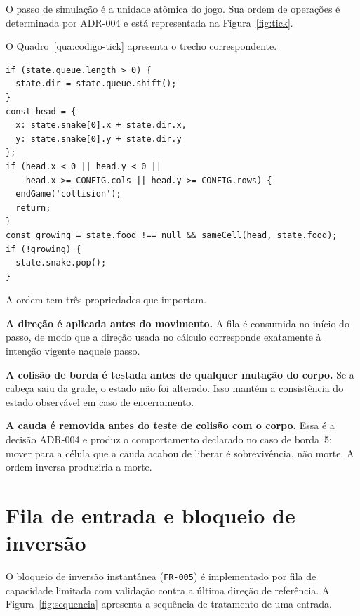O passo de simulação é a unidade atômica do jogo. Sua ordem de operações é
determinada por ADR-004 e está representada na Figura~\ref{fig:tick}.



O Quadro~\ref{qua:codigo-tick} apresenta o trecho correspondente.

\begin{quadro}[htb]
	\caption{Trecho do passo de simulação: cálculo da cabeça, colisão e remoção da cauda (excertado)}
	\label{qua:codigo-tick}
	\begin{lstlisting}[style=codigo]
if (state.queue.length > 0) {
  state.dir = state.queue.shift();
}
const head = {
  x: state.snake[0].x + state.dir.x,
  y: state.snake[0].y + state.dir.y
};
if (head.x < 0 || head.y < 0 ||
    head.x >= CONFIG.cols || head.y >= CONFIG.rows) {
  endGame('collision');
  return;
}
const growing = state.food !== null && sameCell(head, state.food);
if (!growing) {
  state.snake.pop();
}
	\end{lstlisting}
\end{quadro}

A ordem tem três propriedades que importam.

\textbf{A direção é aplicada antes do movimento.} A fila é consumida no início do
passo, de modo que a direção usada no cálculo corresponde exatamente à intenção
vigente naquele passo.

\textbf{A colisão de borda é testada antes de qualquer mutação do corpo.} Se a
cabeça saiu da grade, o estado não foi alterado. Isso mantém a consistência do
estado observável em caso de encerramento.

\textbf{A cauda é removida antes do teste de colisão com o corpo.} Essa é a
decisão ADR-004 e produz o comportamento declarado no caso de borda~5: mover para
a célula que a cauda acabou de liberar é sobrevivência, não morte. A ordem inversa
produziria a morte.

\section{Fila de entrada e bloqueio de inversão}
\label{sec:impl-entrada}

O bloqueio de inversão instantânea (\texttt{FR-005}) é implementado por fila de
capacidade limitada com validação contra a última direção de referência. A
Figura~\ref{fig:sequencia} apresenta a sequência de tratamento de uma entrada.


